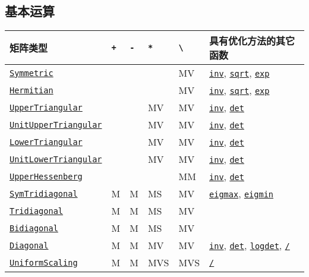 \hypertarget{4026693439467028543}{}


\subsection{基本运算}




\begin{table}[h]

\begin{tabulary}{\linewidth}{|L|L|L|L|L|L|}
\hline
矩阵类型 & \texttt{+} & \texttt{-} & \texttt{*} & \texttt{{\textbackslash}} & 具有优化方法的其它函数 \\
\hline
\hyperlink{17683454167504168761}{\texttt{Symmetric}} &  &  &  & MV & \hyperlink{13336866048543706848}{\texttt{inv}}, \hyperlink{4551113327515323898}{\texttt{sqrt}}, \hyperlink{5801729597955756107}{\texttt{exp}} \\
\hline
\hyperlink{938713992181310063}{\texttt{Hermitian}} &  &  &  & MV & \hyperlink{13336866048543706848}{\texttt{inv}}, \hyperlink{4551113327515323898}{\texttt{sqrt}}, \hyperlink{5801729597955756107}{\texttt{exp}} \\
\hline
\hyperlink{6344726545165008167}{\texttt{UpperTriangular}} &  &  & MV & MV & \hyperlink{13336866048543706848}{\texttt{inv}}, \hyperlink{16543378577000914469}{\texttt{det}} \\
\hline
\hyperlink{17221720404477798393}{\texttt{UnitUpperTriangular}} &  &  & MV & MV & \hyperlink{13336866048543706848}{\texttt{inv}}, \hyperlink{16543378577000914469}{\texttt{det}} \\
\hline
\hyperlink{15116078732779234709}{\texttt{LowerTriangular}} &  &  & MV & MV & \hyperlink{13336866048543706848}{\texttt{inv}}, \hyperlink{16543378577000914469}{\texttt{det}} \\
\hline
\hyperlink{2163321084999097240}{\texttt{UnitLowerTriangular}} &  &  & MV & MV & \hyperlink{13336866048543706848}{\texttt{inv}}, \hyperlink{16543378577000914469}{\texttt{det}} \\
\hline
\hyperlink{6167777885202579792}{\texttt{UpperHessenberg}} &  &  &  & MM & \hyperlink{13336866048543706848}{\texttt{inv}}, \hyperlink{16543378577000914469}{\texttt{det}} \\
\hline
\hyperlink{6062797780727203318}{\texttt{SymTridiagonal}} & M & M & MS & MV & \hyperlink{1568196261511691624}{\texttt{eigmax}}, \hyperlink{658135215942727363}{\texttt{eigmin}} \\
\hline
\hyperlink{17820886359515748171}{\texttt{Tridiagonal}} & M & M & MS & MV &  \\
\hline
\hyperlink{6156150905679680892}{\texttt{Bidiagonal}} & M & M & MS & MV &  \\
\hline
\hyperlink{3300114559258360989}{\texttt{Diagonal}} & M & M & MV & MV & \hyperlink{13336866048543706848}{\texttt{inv}}, \hyperlink{16543378577000914469}{\texttt{det}}, \hyperlink{12765142073947245963}{\texttt{logdet}}, \hyperlink{4103478871488785445}{\texttt{/}} \\
\hline
\hyperlink{723087258311673942}{\texttt{UniformScaling}} & M & M & MVS & MVS & \hyperlink{4103478871488785445}{\texttt{/}} \\
\hline
\end{tabulary}


\end{table}
